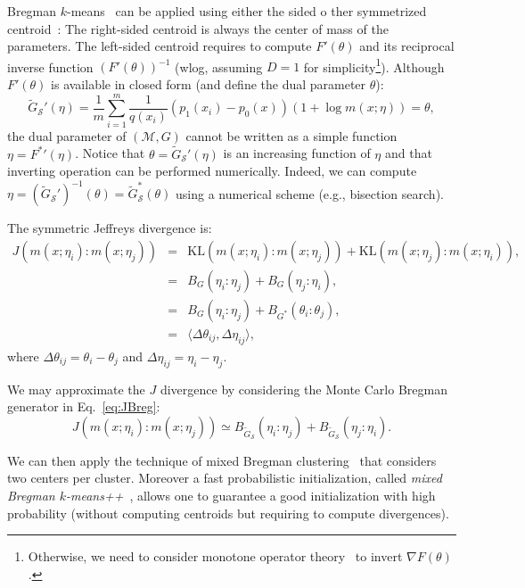 \documentclass[graybox]{svmult}
\def\inner#1#2{{\langle #1,#2\rangle}}
\def\KL{\mathrm{KL}}
\def\tildeG{\tilde{G}}
\def\calS{\mathcal{S}}
\def\calM{\mathcal{M}}
\begin{document}
 
Bregman $k$-means~\cite{Bregman-2005,Fast1DClustering-2017} can be applied using either the sided o ther symmetrized centroid~\cite{SymBregman-2009}:
The right-sided centroid is always the center of mass of the parameters.
The left-sided centroid requires to compute $F'(\theta)$ and its reciprocal inverse function $(F'(\theta))^{-1}$ (wlog, assuming $D=1$ for simplicity\footnote{Otherwise, we need to consider monotone operator theory~\cite{SymbolicMonotoneOp-2017} to invert $\nabla F(\theta)$.}).
Although $F'(\theta)$ is available in closed form (and define the dual parameter $\theta$):
\begin{equation}
\tildeG_\calS'(\eta) = \frac{1}{m} \sum_{i=1}^m  \frac{1}{q(x_i)}  \left(p_1(x_i)-p_0(x)\right) \left(1+\log m(x;\eta)\right) =\theta,
\end{equation}
the dual parameter of $(\calM,G)$ cannot be written as a simple function $\eta={F^*}'(\eta)$.
Notice that $\theta=\tildeG_\calS'(\eta)$ is an increasing function of $\eta$ and that inverting operation can be performed numerically.
Indeed, we can compute $\eta=(\tildeG_\calS')^{-1}(\theta)=\tildeG_\calS^*(\theta)$ using a numerical scheme (e.g., bisection search).

                                                  
The symmetric Jeffreys divergence is:
\begin{eqnarray}
J(m(x;\eta_i):m(x;\eta_j)) &=& \KL(m(x;\eta_i):m(x;\eta_j))+\KL(m(x;\eta_j):m(x;\eta_i)),\\
&=& B_G(\eta_i:\eta_j)+B_G(\eta_j:\eta_i),\label{eq:JBreg}\\
&=& B_G(\eta_i:\eta_j)+B_{G^*}(\theta_i:\theta_j),\\
&=&\inner{\Delta\theta_{ij}}{\Delta\eta_{ij}},
\end{eqnarray}
where $\Delta\theta_{ij}=\theta_i-\theta_j$ and $\Delta\eta_{ij}=\eta_i-\eta_j$.



We may approximate the $J$ divergence by considering the Monte Carlo Bregman generator in Eq.~\ref{eq:JBreg}:
\begin{equation}
J(m(x;\eta_i):m(x;\eta_j)) \simeq B_{\tildeG_\calS}(\eta_i:\eta_j)+B_{\tildeG_\calS}(\eta_j:\eta_i).
\end{equation}
 
We can then apply the technique of mixed Bregman clustering~\cite{MixedBregmanClustering-2008} that considers two centers per cluster.
Moreover a fast probabilistic initialization, called {\em mixed Bregman $k$-means++}~\cite{MixedBregmanClustering-2008}, allows one to guarantee a good initialization with high probability (without computing centroids but requiring to compute divergences).
\end{document}
